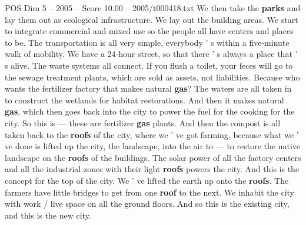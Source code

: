\begin{textsample}{POS Dim 5 – 2005 – Score 10.00 – 2005/t000418.txt}
We then take the \textbf{parks} and lay them out as ecological infrastructure.
We lay out the building areas.
We start to integrate commercial and mixed use so the people all have centers and places to be.
The transportation is all very simple, everybody ' s within a five-minute walk of mobility.
We have a 24-hour street, so that there ' s always a place that ' s alive.
The waste systems all connect.
If you flush a toilet, your feces will go to the sewage treatment plants, which are sold as assets, not liabilities.
Because who wants the fertilizer factory that makes natural \textbf{gas}?
The waters are all taken in to construct the wetlands for habitat restorations.
And then it makes natural \textbf{gas}, which then goes back into the city to power the fuel for the cooking for the city.
So this is — these are fertilizer \textbf{gas} plants.
And then the compost is all taken back to the \textbf{roofs} of the city, where we ' ve got farming, because what we ' ve done is lifted up the city, the landscape, into the air to — to restore the native landscape on the \textbf{roofs} of the buildings.
The solar power of all the factory centers and all the industrial zones with their light \textbf{roofs} powers the city.
And this is the concept for the top of the city.
We ' ve lifted the earth up onto the \textbf{roofs}.
The farmers have little bridges to get from one \textbf{roof} to the next.
We inhabit the city with work / live space on all the ground floors.
And so this is the existing city, and this is the new city.

\end{textsample}
